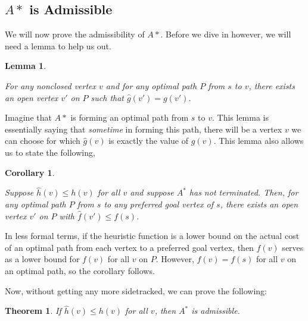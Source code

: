 \documentclass[letterpaper, 10pt]{article}
\newtheorem{lemma}{Lemma}[section]
\newtheorem{cor}{Corollary}[section]
\newtheorem{thm}{Theorem}[section]
\theoremstyle{definition}
\theoremstyle{Algorithm}
\begin{document}

\subsection{$A*$ is Admissible} %

We will now prove the admissibility of $A*$. Before we dive in 
however, we will need a lemma to help us out.

\begin{lemma}\label{lem:ghatg}

  For any nonclosed vertex $v$ and for any optimal path
  $P$ from $s$ to $v$, there exists an open vertex $v'$
  on $P$ such that $\hat{g}(v')=g(v')$.

\end{lemma}

\noindent Imagine that $A*$ is forming an optimal path from $s$ to $v$. 
This lemma is essentially saying that \emph{sometime}
in forming this path, there will be a vertex $v$ we can choose
for which $\hat{g}(v)$ is exactly the value of $g(v)$. This lemma
also allows us to state the following,

\begin{cor}\label{cor:fs}

  Suppose $\hat{h}(v) \leq h(v)$ for all $v$ and suppose $A^*$
  has not terminated. Then, for any optimal path $P$ from $s$
  to any preferred goal vertex of $s$, there exists an open vertex
  $v'$ on $P$ with $\hat{f}(v') \leq f(s)$.

\end{cor}

\noindent In less formal terms, if the heuristic function is a lower
bound on the actual cost of an optimal path from each vertex to a 
preferred goal vertex, then $\hat{f}(v)$ serves as a lower bound
for $f(v)$ for all $v$ on $P$. However, $f(v)=f(s)$ 
for all $v$ on an optimal path, so the corollary follows.

Now, without getting any more sidetracked, we can prove the following:

\begin{thm}
  
  If $\hat{h}(v) \leq h(v)$ for all $v$, then $A^*$ is admissible.

\end{thm}
\end{document}
